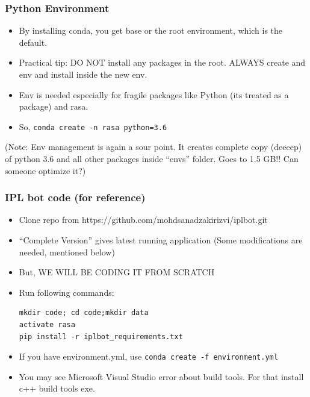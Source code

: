 
 \begin{frame}[fragile]\frametitle{Python Environment}
\begin{itemize}
\item By installing conda, you get base or the root environment, which is the default.
\item Practical tip: DO NOT install any packages in the root. ALWAYS create and env and install inside the new env.
\item Env is needed especially for fragile packages like Python (its treated as a package) and rasa.
\item So, \lstinline|conda create -n rasa python=3.6| 
\end{itemize}

(Note: Env management is again a sour point. It creates complete copy (deeeep) of python 3.6 and all other packages inside ``envs'' folder. Goes to 1.5 GB!! Can someone optimize it?)
\end{frame}

 \begin{frame}[fragile]\frametitle{IPL bot code (for reference)}
\begin{itemize}
\item Clone repo from https://github.com/mohdsanadzakirizvi/iplbot.git
\item  ``Complete Version'' gives latest running application (Some modifications are needed, mentioned below)
\item But, WE WILL BE CODING IT FROM SCRATCH
\item Run following commands:

\begin{lstlisting}
mkdir code; cd code;mkdir data
activate rasa
pip install -r iplbot_requirements.txt
\end{lstlisting}
\item If you have environment.yml, use \lstinline|conda create -f environment.yml|
\item You may see Microsoft Visual Studio error about build tools. For that install c++ build tools exe.

\end{itemize}
\end{frame}



